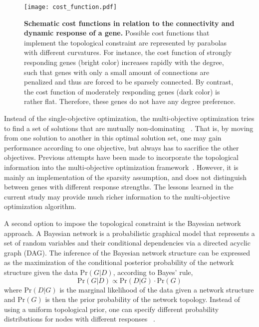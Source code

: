 \begin{figure}[!ht]
\begin{center}
\texttt{[image: cost\_function.pdf]}
\end{center}
\caption[Topological constraint in reverse-engineering]{
{\bf Schematic cost functions in relation to the connectivity and dynamic 
response of a gene.}
Possible cost functions that implement the topological constraint are
represented by parabolas with different curvatures. For instance, the 
cost function of strongly responding genes (bright color) increases
rapidly with the degree, such that genes with only a small amount of
connections are penalized and thus are forced to be sparsely connected.
By contrast, the cost function of moderately responding genes (dark color)
is rather flat. Therefore, these genes do not have any degree preference.
}
\label{fig:cost_function}
\end{figure}

Instead of the single-objective optimization, the multi-objective
optimization tries to find a set of solutions that are mutually non-dominating~%
\citep{Deb2002,Higuera2012}.
That is, by moving from one solution to another in this optimal solution set,
one may gain performance according to one objective, but always has to 
sacrifice the other objectives.
Previous attempts have been made to incorporate the topological information
into the multi-objective optimization framework~\citep{Spieth2005}. However,
it is mainly an implementation of the sparsity assumption, and does not
distinguish between genes with different response strengths. The lessons
learned in the current study may provide much richer information to the 
multi-objective optimization algorithm.

A second option to impose the topological constraint is the Bayesian network
approach. A Bayesian network is a probabilistic graphical model that represents 
a set of random variables and their conditional dependencies via a directed 
acyclic graph (DAG). The inference of the Bayesian network structure can be 
expressed as the maximization of the conditional posterior probability of 
the network structure given the data $\mathrm{Pr}(G|D)$, according to Bayes' rule,
\begin{equation}
\mathrm{Pr}(G|D) \propto \mathrm{Pr}(D|G) \cdot \mathrm{Pr}(G)
\end{equation}
where $\mathrm{Pr}(D|G)$ is the marginal likelihood of the data given a network 
structure and $\mathrm{Pr}(G)$ is then the prior probability of the network 
topology. Instead of using a uniform topological prior, one can specify 
different probability distributions for nodes with different responses~%
\citep{Friedman1998,Huang2007}.

